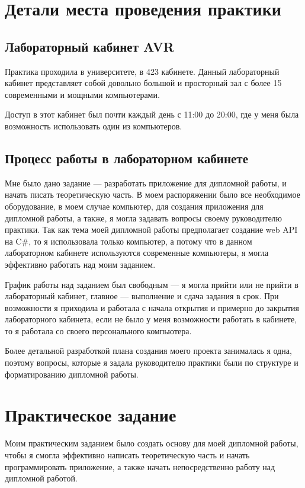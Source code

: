 \documentclass[a4paper,12pt]{report}
\begin{document}
\chapter{Детали места проведения практики}

\section{Лабораторный кабинет AVR}

Практика проходила в университете, в 423 кабинете.
Данный лабораторный кабинет представляет собой довольно большой и просторный зал с более 15 современными и мощными компьютерами.

Доступ в этот кабинет был почти каждый день с 11:00 до 20:00, где у меня была возможность использовать один из компьютеров.

\section{Процесс работы в лабораторном кабинете}

Мне было дано задание --- разработать приложение для дипломной работы, и начать писать теоретическую часть. 
В моем распоряжении было все необходимое оборудование, в моем случае компьютер, для создания приложения для дипломной работы, 
а также, я могла задавать вопросы своему руководителю практики. Так как тема моей дипломной работы предполагает создание web API на C\#, 
то я использовала только компьютер, а потому что в данном лабораторном кабинете используются современные компьютеры, 
я могла эффективно работать над моим заданием. 

График работы над заданием был свободным --- я могла прийти или не прийти в лабораторный кабинет, главное --- выполнение и сдача задания в срок.
При возможности я приходила и работала с начала открытия и примерно до закрытия лабораторного кабинета, если не было у меня возможности работать в кабинете, 
то я работала со своего персонального компьютера.

Более детальной разработкой плана создания моего проекта занималась я одна, поэтому вопросы, которые я задала руководителю практики были по 
структуре и форматированию дипломной работы.

\chapter{Практическое задание}

Моим практическим заданием было создать основу для моей дипломной работы, чтобы я смогла эффективно написать теоретическую часть и начать 
программировать приложение, а также начать непосредственно работу над дипломной работой.
\end{document}
